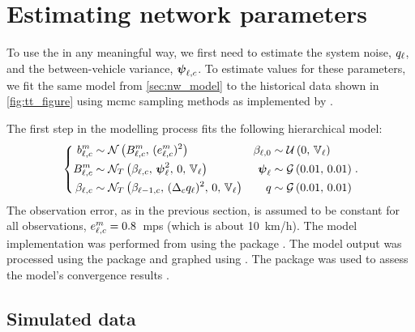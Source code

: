 
\section{Estimating network parameters}
\label{sec:nw_par_est}


To use the \kf{} in any meaningful way, we first need to estimate the system noise, $q_\ell$, and the between-vehicle variance, $\mathbf{\boldsymbol{\psi}}_{\ell,c}$. To estimate values for these parameters, we fit the same model from \cref{sec:nw_model} to the historical data shown in \cref{fig:tt_figure} using \gls{mcmc} sampling methods as implemented by  \citep{JAGS}.


The first step in the modelling process fits the following hierarchical model:
\begin{equation}
\label{eq:nw_model_simple}
\left\{
\begin{split}
b_{\ell,c}^m &\sim \mathcal{N}\left(B_{\ell,c}^m,\, (e_{\ell,c}^m)^2\right) &
\beta_{\ell,0} &\sim \mathcal{U}\left(0,\, \mathbb{V}_\ell\right) \nonumber \\
B_{\ell,c}^m &\sim \mathcal{N}_T\left(\beta_{\ell,c},\, \mathbf{\boldsymbol{\psi}}_{\ell}^2,\, 0,\, \mathbb{V}_\ell\right) &
\mathbf{\boldsymbol{\psi}}_\ell &\sim \mathcal{G}\left(0.01,\, 0.01\right) \\
\beta_{\ell,c} &\sim \mathcal{N}_T\left(\beta_{\ell-1,c},\, (\Delta_c q_{\ell})^2,\, 0,\, \mathbb{V}_\ell\right) &
q &\sim \mathcal{G}\left(0.01,\, 0.01\right) \nonumber
\end{split}
\right. .
\end{equation}
The observation error, as in the previous section, is assumed to be constant for all observations, $e_{\ell,c}^m = 0.8$~\gls{mps} (which is about 10~km/h). The model implementation was performed from \Rstats{} using the  package \citep{rjags}. The model output was processed using the  package \citep{tidybayes} and graphed using  \citep{ggplot2}. The  package was used to assess the model's convergence results \citep{coda}.


\subsection{Simulated data}
\label{nw_par_est_sim}


